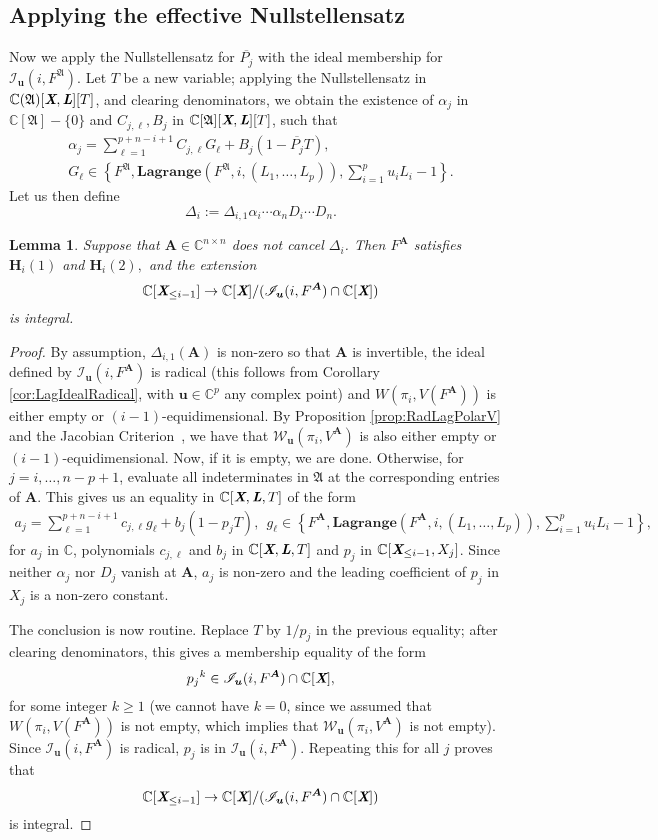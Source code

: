 \documentclass[a4paper]{article}
\def\A{\mathfrak{A}}
\def\Lb{\textit{\textbf{L}}}
\def\Xb{\textit{\textbf{X}}}
\def\mA{{\bm A}}
\def\ub{{\bm u}}
\def\pjb{\overline{P_{j}}}
\def\D{\Delta}
\def\C{\mathbb{C}}
\def\WiA{W(\pi_i,V(F^{\mA}))}
\def\lagFA{{\bm{Lagrange}}(F^{\mA},i,(L_1,\hdots,L_p))}
\def\lagFfA{{\bm{Lagrange}}(F^{\A},i,(L_1,\hdots,L_p))}
\def\IilA{\mathscr{I}_{\ub}(i,F^{\mA})}
\def\IilfA{\mathscr{I}_{\ub}(i,F^{\A})}
\def\WilA{\mathscr{W}_{\ub}(\pi_i,V^{\mA})}
\def\udl{\sum_{i=1}^pu_iL_i}
\newtheorem{lemma}[theorem]{Lemma}
\begin{document}
\subsection{Applying the effective Nullstellensatz}
Now we apply the Nullstellensatz for $\pjb$ with the ideal membership for $\IilfA.$ Let $T$ be a new variable; applying the
Nullstellensatz in $\C(\A)[\Xb,\Lb][T]$, and clearing
denominators, we obtain the existence of $\alpha_j$ in
$\C[\A]-\{0\}$ and $ C_{j,\ell},B_j$ in
$\C[\A][\Xb,\Lb][T]$, such that
\begin{align*}
\alpha_j = \sum_{\ell=1}^{p+n-i+1} C_{j,\ell} G_\ell + B_j (1-\pjb T),\\  G_\ell \in 
\left\{ 
F^\A,\lagFfA, \udl-1
\right\}.
\end{align*}
Let us then define 
$$\D_{i}:=\D_{i,1} \alpha_i \cdots \alpha_n D_i \cdots D_n.$$

\begin{lemma}\label{lem:6.4}
Suppose that $\mA \in \C^{n\times n}$ does not cancel $\D_{i}$. Then $F^{\mA}$ satisfies $\bm H_i(1)$ and $\bm H_i(2),$ and the extension
\[
 \C[\Xb_{\leq i-1}]\rightarrow \C[\Xb]/(\IilA \cap \C[\Xb])
\]
is integral.
\end{lemma}

\begin{proof}
By assumption, $\D_{i,1}(\mA)$ is non-zero so that $\mA$ is
invertible, the
ideal defined by $\IilA$ is radical (this follows from Corollary \ref{cor:LagIdealRadical}, with $\ub \in \C^p$ any complex point) and 
$\WiA$ is either empty or $(i-1)$-equidimensional. By Proposition \ref{prop:RadLagPolarV} and the Jacobian Criterion~\cite[Corollary 16.20]{ECA}, we have that $\WilA$ is also either empty or $(i-1)$-equidimensional. Now, if
it is empty, we are done. Otherwise, for $j=i,\dots,n-p+1$, evaluate all indeterminates in $\A$ at the
corresponding entries of $\mA$. This gives us
an equality in $\C[\Xb,\Lb,T]$ of the form
\begin{align*}
a_j = \sum_{\ell=1}^{p+n-i+1} c_{j,\ell} g_\ell + b_j (1-p_j T),\ \  g_\ell \in 
\left\{ 
F^{\mA}, \lagFA, \udl-1
\right\},
\end{align*}
for $a_j$ in $\C$, polynomials $c_{j,\ell}$ and $b_j$ in
$\C[\Xb,\Lb,T]$ and $p_j$ in
$\C[\Xb_{\leq i-1},X_j]$. Since neither $\alpha_j$ nor $D_j$
vanish at $\mA$, $a_j$ is non-zero and the leading coefficient of
$p_j$ in $X_j$ is a non-zero constant.

The conclusion is now routine. Replace $T$ by $1/p_j$ in the
previous equality; after clearing denominators, this gives a
membership equality of the form 
\[
p_j{}^k \in \IilA \cap \C[\Xb],
\]
for some integer $k \ge 1$ (we cannot have $k=0$, since we assumed that $\WiA$ is not empty, which implies that $\WilA$ is not empty). Since $\IilA$ is radical,
$p_j$ is in $\IilA$. Repeating this for all $j$ proves that 
\[
\C[\Xb_{\leq i-1}]\rightarrow\C[\Xb]/(\IilA \cap \C[\Xb])
\]
is integral.
\end{proof}
\end{document}

